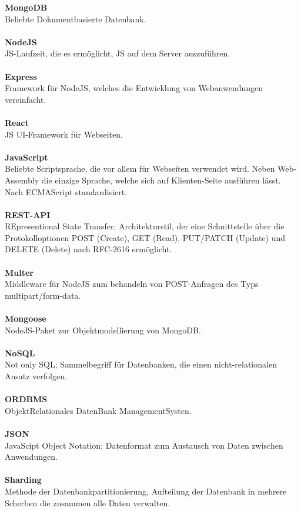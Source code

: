 \textbf{MongoDB}\\
Beliebte Dokumentbasierte Datenbank.
\\\\
\textbf{NodeJS}\\
JS-Laufzeit, die es ermöglicht, JS auf dem Server auszuführen.
\\\\
\textbf{Express}\\
Framework für NodeJS, welches die Entwicklung von Webanwendungen vereinfacht.
\\\\
\textbf{React}\\
JS UI-Framework für Webseiten.
\\\\
\textbf{JavaScript}\\
Beliebte Scriptsprache, die vor allem für Webseiten verwendet wird. Neben Web-Assembly die einzige Sprache, welche sich auf Klienten-Seite ausführen lässt. Nach ECMAScript standardisiert.
\\\\
\textbf{REST-API}\\
REpresentional State Transfer; Architekturstil, der eine Schnittstelle über die Protokolloptionen POST (Create), GET (Read),  PUT/PATCH (Update) und DELETE (Delete) nach RFC-2616 ermöglicht.
\\\\
\textbf{Multer}\\
Middleware für NodeJS zum behandeln von POST-Anfragen des Typs multipart/form-data.
\\\\
\textbf{Mongoose}\\
NodeJS-Paket zur Objektmodellierung von MongoDB.
\\\\
\textbf{NoSQL}\\
Not only SQL; Sammelbegriff für Datenbanken, die einen nicht-relationalen Ansatz verfolgen.
\\\\
\textbf{ORDBMS}\\
ObjektRelationales DatenBank ManagementSysten.
\\\\
\textbf{JSON}\\
JavaScipt Object Notation; Datenformat zum Austausch von Daten zwischen Anwendungen.
\\\\
\textbf{Sharding}\\
Methode der Datenbankpartitionierung, Aufteilung der Datenbank in mehrere Scherben die zusammen alle Daten verwalten.
